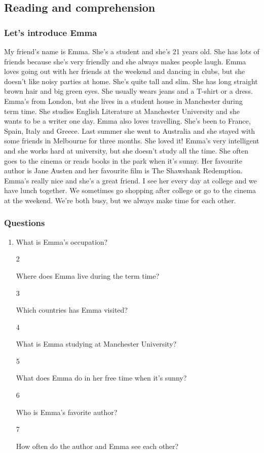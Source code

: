 \documentclass[]{article} %
\begin{document}
	


	\subsection*{Reading and comprehension}
	
	\subsubsection*{Let's introduce Emma}
	
My friend's name is Emma. She's a student and she's 21 years old. She has lots of friends because she's very friendly and she always makes people laugh. Emma loves going out with her friends at the weekend and dancing in clubs, but she doesn't like noisy parties at home. She's quite tall and slim. She has long straight brown hair and big green eyes. She usually wears jeans and a T-shirt or a dress. Emma's from London, but she lives in a student house in Manchester during term time. She studies English Literature at Manchester University and she wants to be a writer one day. Emma also loves travelling. She's been to France, Spain, Italy and Greece. Last summer she went to Australia and she stayed with some friends in Melbourne for three months. She loved it! Emma's very intelligent and she works hard at university, but she doesn't study all the time. She often goes to the cinema or reads books in the park when it's sunny. Her favourite author is Jane Austen and her favourite film is The Shawshank Redemption. Emma's really nice and she's a great friend. I see her every day at college and we have lunch together. We sometimes go shopping after college or go to the cinema at the weekend. We're both busy, but we always make time for each other.
	
	
	\subsubsection*{Questions}
	
	\begin{enumerate}
\item What is Emma's occupation?

2

Where does Emma live during the term time?

3

Which countries has Emma visited?

4

What is Emma studying at Manchester University?

5

What does Emma do in her free time when it's sunny?

6

Who is Emma's favorite author?

7

How often do the author and Emma see each other?
	\end{enumerate}
	
\end{document}

